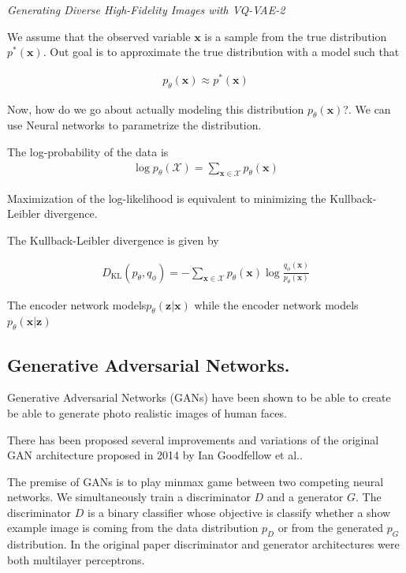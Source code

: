 \textit{Generating Diverse High-Fidelity Images with VQ-VAE-2}\cite{vqvae2}


We assume that the observed variable $\mathbf{x}$ is a sample from the true distribution $p^*(\mathbf{x})$.\cite{vaeintro} Out goal is to approximate the true distribution with a model such that

\begin{align}
  p_\theta(\mathbf{x})\approx p^*(\mathbf{x})
\end{align}

Now, how do we go about actually modeling this distribution $p_\theta(\mathbf{x})$?. We can use Neural networks to parametrize the distribution.

The log-probability of the data is
\begin{align}
  \log p_\theta(\mathcal{X}) = \sum_{\mathbf{x}\in\mathcal{X}} p_\theta(\mathbf{x})
\end{align}

Maximization of the log-likelihood is equivalent to minimizing the Kullback-Leibler divergence.

The Kullback-Leibler divergence is given by

\begin{align}
D_{\text{KL}}(p_\theta,q_\phi) = -\sum_{\mathbf{x}\in\mathcal{X}}p_\theta(\mathbf{x})\log \frac{q_\phi(\mathbf{x})}{p_\theta(\mathbf{x})}
\end{align}

The encoder network models$p_\theta(\mathbf{z}|\mathbf{x})$ while the encoder network models $p_\theta(\mathbf{x}|\mathbf{z})$



\subsection{Generative Adversarial Networks.}

Generative Adversarial Networks (GANs) have been shown to be able to create be able to generate photo realistic images of human faces.\cite{progan}

There has been proposed several improvements and variations of the original GAN architecture proposed in 2014 by Ian Goodfellow et al.\cite{gan}.

The premise of GANs is to play minmax game between two competing neural networks. We simultaneously train a discriminator $D$ and a generator $G$.
The discriminator $D$ is a binary classifier whose objective is classify whether a show example image is coming from the data distribution $p_D$ or from the generated $p_G$ distribution. In the original paper discriminator and generator architectures were both multilayer perceptrons.

